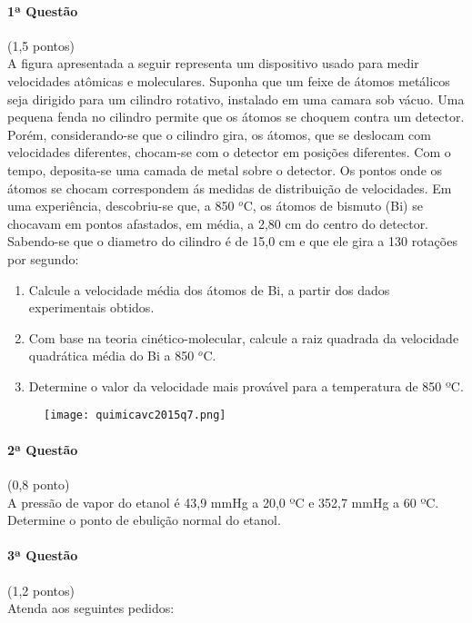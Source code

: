 \documentclass[12pt,a4paper]{article}
\begin{document}
\paragraph{1ª Questão} (1,5 pontos)\\
A figura apresentada a seguir representa um dispositivo usado para medir velocidades atômicas e moleculares. Suponha que um feixe de átomos metálicos seja dirigido para um cilindro rotativo, instalado em uma camara sob vácuo. Uma pequena fenda no cilindro permite que os átomos se choquem contra um detector. Porém, considerando-se que o cilindro gira, os átomos, que se deslocam com velocidades diferentes, chocam-se com o detector em posições diferentes. Com o tempo, deposita-se uma camada de metal sobre o detector. Os pontos onde os átomos se chocam correspondem ás medidas de distribuição de velocidades. Em uma experiência, descobriu-se que, a 850 $^o$C, os átomos de bismuto (Bi) se chocavam em pontos afastados, em média, a 2,80 cm do centro do detector. Sabendo-se que o diametro do cilindro é de 15,0 cm e que ele gira a 130 rotações por segundo:

\begin{enumerate}[label=\roman*.]

\item Calcule a velocidade média dos átomos de Bi, a partir dos dados experimentais obtidos.

\item Com base na teoria cinético-molecular, calcule a raiz quadrada da velocidade quadrática média do Bi a 850 $^o$C.

\item Determine o valor da velocidade mais provável para a temperatura de 850 ºC.

\end{enumerate}

\begin{figure}[h]
\centering
\texttt{[image: quimicavc2015q7.png]}
\end{figure}

\paragraph{2ª Questão} (0,8 ponto)\\
A pressão de vapor do etanol é 43,9 mmHg a 20,0 ºC e 352,7 mmHg a 60 ºC. Determine o ponto de ebulição normal do etanol.


\paragraph{3ª Questão} (1,2 pontos)\\
Atenda aos seguintes pedidos:
\end{document}
